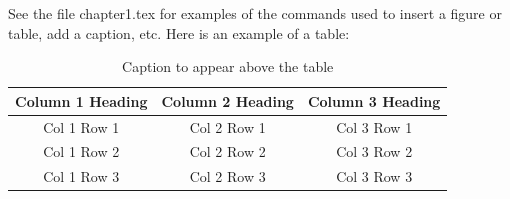 See the file chapter1.tex for examples of the commands used to
insert a figure or table, add a caption, etc.  Here is an example of
a table:

\begin{table}[ht]

    \begin{center}

    \caption{Caption to appear above the table}
    \begin{tabular}[c]{|c|c|c|}
        \hline
        Column 1 Heading & Column 2 Heading & Column 3 Heading \\
        \hline
        Col 1 Row 1 & Col 2 Row 1 & Col 3 Row 1\\
        Col 1 Row 2 & Col 2 Row 2 & Col 3 Row 2\\
        Col 1 Row 3 & Col 2 Row 3 & Col 3 Row 3\\
        \hline
    \end{tabular}

    \label{table1}
   \end{center}
\end{table}



